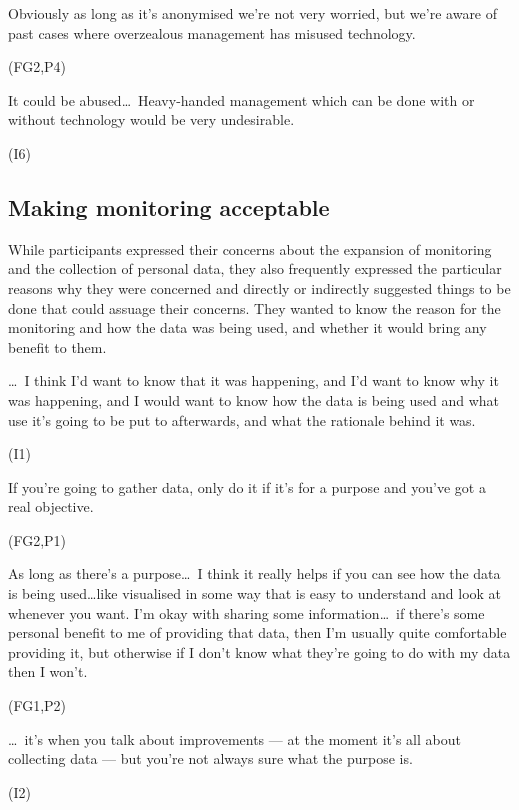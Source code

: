 \begin{qt}Obviously as long as it’s anonymised we’re not very worried,
  but we’re aware of past cases where overzealous management has
  misused technology.\end{qt} (FG2,P4) 

\begin{qt}It could be abused\ldots\  Heavy-handed management which can
  be done with or without technology would be very
  undesirable.\end{qt} (I6) 

\subsection{Making monitoring acceptable}
\label{sec:making-monit-accept}

While participants expressed their concerns about the expansion of monitoring and the collection of personal data, they also frequently
expressed the particular reasons why they were concerned and directly
or indirectly suggested things to be done that could assuage their
concerns. They wanted to know the reason for the monitoring and how
the data was being used, and whether it would bring any benefit to them.

\begin{qt} \ldots\  I think I’d want to know
that it was happening, and I’d want to know why it was happening, and
I would want to know how the data is being used and what use it’s
going to be put to afterwards, and what the rationale behind it was.\end{qt} (I1)

\begin{qt}If you’re going to gather data, only do it if it’s for a purpose and you’ve got a real objective.\end{qt} (FG2,P1)

\begin{qt}As long as there’s a purpose\ldots\  I think it really helps if you can see how the data is being used…like visualised in some way that is easy to understand and look at whenever you want. I’m okay with sharing some information\ldots\  if there’s some personal benefit to me of providing that data, then I’m usually quite comfortable providing it, but otherwise if I don’t know what they’re going to do with my data then I won’t.\end{qt}(FG1,P2)

\begin{qt}\ldots\  it’s when you talk about improvements --- at the moment it’s all
about collecting data --- but you’re not always sure what the purpose
is.\end{qt} (I2)

